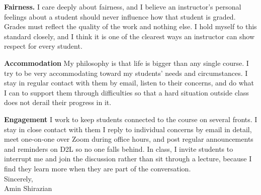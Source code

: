 \documentclass[10.5pt]{article}
\begin{document}
	\textbf{Fairness.} I care deeply about fairness, and I believe an instructor's personal feelings about a student should never influence how that student is graded. Grades must reflect the quality of the work and nothing else. I hold myself to this standard closely, and I think it is one of the clearest ways an instructor can show respect for every student.

	\textbf{Accommodation} My philosophy is that life is bigger than any single course. I try to be very accommodating toward my students' needs and circumstances. I stay in regular contact with them by email, listen to their concerns, and do what I can to support them through difficulties so that a hard situation outside class does not derail their progress in it.

	\textbf{Engagement} I work to keep students connected to the course on several fronts. I stay in close contact with them I reply to individual concerns by email in detail, meet one-on-one over Zoom during office hours, and post regular announcements and reminders on D2L so no one falls behind. In class, I invite students to interrupt me and join the discussion rather than sit through a lecture, because I find they learn more when they are part of the conversation.\\
	
	Sincerely,\\[4pt]
	Amin Shirazian

	   
\end{document}
